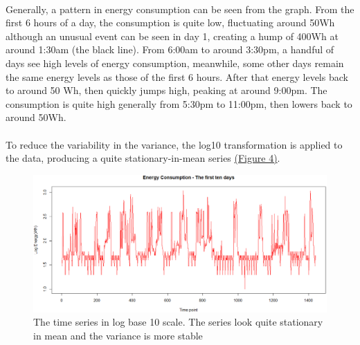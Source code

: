 \documentclass[12pt]{article}
\begin{document}
\paragraph{}
Generally, a pattern in energy consumption can be seen from the graph. From the first 6 hours of a day, the consumption is quite low, fluctuating around 50Wh although an unusual event can be seen in day 1, creating a hump of 400Wh at around 1:30am (the black line). From 6:00am to around 3:30pm, a handful of days see high levels of energy consumption, meanwhile, some other days remain the same energy levels as those of the first 6 hours. After that energy levels back to around 50 Wh, then quickly jumps high, peaking at around 9:00pm. The consumption is quite high generally from 5:30pm to 11:00pm, then lowers back to around 50Wh.

\paragraph{}
To reduce the variability in the variance, the log10 transformation is  applied to the data, producing a quite stationary-in-mean series \href{figure4}{(Figure 4)}.
\begin{figure}[H]
  \includegraphics[width=\linewidth]{figure4.png}
  \caption{The time series in log base 10 scale. The series look quite stationary in mean and the variance is more stable}
  \label{fig:figure4}
\end{figure}
\end{document}
